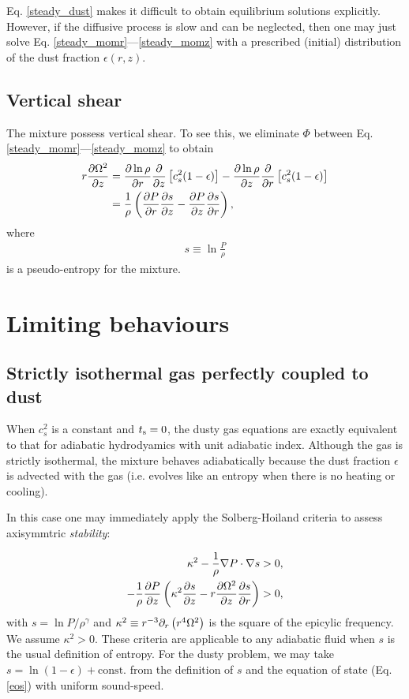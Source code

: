 Eq. \ref{steady_dust} makes it difficult to obtain equilibrium
solutions explicitly. However, if the diffusive process is slow and
can be neglected, then one may just solve
Eq. \ref{steady_momr}---\ref{steady_momz} with a prescribed (initial)
distribution of the dust fraction $\epsilon(r,z)$. 

\subsection{Vertical shear}
The mixture possess vertical shear. To see this, we eliminate $\Phi$
between Eq. \ref{steady_momr}---\ref{steady_momz} to 
obtain 
\begin{align}\label{vshear}
  r\frac{\partial \Omega^2}{\partial z} &= \frac{\partial\ln{\rho}}{\partial r}\frac{\partial}{\partial
    z}\left[c_s^2(1-\epsilon)\right] - \frac{\partial\ln{\rho}}{\partial z}
  \frac{\partial}{\partial r} \left[c_s^2(1-\epsilon)\right]\\  
  & = \frac{1}{\rho}\left(\frac{\partial P}{\partial r}\frac{\partial s}{\partial z} -\frac{\partial
    P}{\partial z}\frac{\partial s}{\partial r} \right),\notag
\end{align}
where
\begin{align}
   s \equiv \ln \frac{P}{\rho}
\end{align}
is a pseudo-entropy for the mixture. 

\section{Limiting behaviours}

\subsection{Strictly isothermal gas perfectly coupled to dust}  
When $c_s^2$ is a constant and $t_\mathrm{s}=0$, the dusty gas equations are
exactly equivalent to that for adiabatic hydrodyamics with unit adiabatic
index. Although the gas is strictly isothermal, the mixture behaves 
adiabatically because the dust fraction $\epsilon$ is advected with
the gas (i.e. evolves like an entropy when there is no heating or
cooling). 

In this case one may immediately apply the Solberg-Hoiland
criteria to assess axisymmtric \emph{stability}:  

\begin{align}
  \kappa^2 - \frac{1}{\rho}\nabla P \cdot \nabla s &> 0,\\
  -\frac{1}{\rho}\frac{\partial P}{\partial z} \left(\kappa^2 \frac{\partial s}{\partial z} -
  r\frac{\partial\Omega^2}{\partial z}\frac{\partial s}{\partial r}\right) &>0, 
\end{align}
with $s = \ln{P/\rho^\gamma}$ and 
$\kappa^2 \equiv r^{-3}\partial_r\left(r^4\Omega^2\right)$ is the
square of the epicylic frequency. We assume $\kappa^2>0$. 
These criteria are applicable to any adiabatic fluid when $s$
is the usual definition of entropy. For the dusty problem, we may take 
$s=\ln{(1-\epsilon)}+\mathrm{const.}$ from the definition of $s$ and  
the equation of state (Eq. \ref{eos}) with uniform sound-speed. 

